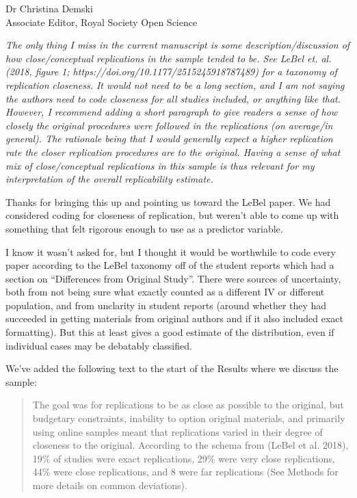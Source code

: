 \documentclass{stanfordletter}
\newcommand{\theysaid}[1]{\begin{leftbar} \noindent 
		\textsl{ #1}\end{leftbar}}
\newcommand{\revised}[1]{\begin{quote}	#1 \end{quote}}
\begin{document}
\begin{letter}{Dr Christina Demski \\ Associate Editor, Royal Society Open Science}
          \theysaid{The only thing I miss in the current manuscript is some description/discussion of how close/conceptual replications in the sample tended to be. See LeBel et. al. (2018, figure 1; https://doi.org/10.1177/2515245918787489) for a taxonomy of replication closeness. It would not need to be a long section, and I am not saying the authors need to code closeness for all studies included, or anything like that. However, I recommend adding a short paragraph to give readers a sense of how closely the original procedures were followed in the replications (on average/in general). The rationale being that I would generally expect a higher replication rate the closer replication procedures are to the original. Having a sense of what mix of close/conceptual replications in this sample is thus relevant for my interpretation of the overall replicability estimate.
          }
          
          Thanks for bringing this up and pointing us toward the LeBel paper. We had considered coding for closeness of replication, but weren't able to come up with something that felt rigorous enough to use as a predictor variable. 
          
          I know it wasn't asked for, but I thought it would be worthwhile to code every paper according to the LeBel taxonomy off of the student reports which had a section on ``Differences from Original Study''. There were sources of uncertainty, both from not being sure what exactly counted as a different IV or different population, and from unclarity in student reports (around whether they had succeeded in getting materials from original authors and if it also included exact formatting). But this at least gives a good estimate of the distribution, even if individual cases may be debatably classified. 
         
          We've added the following text to the start of the Results where we discuss the sample:
          
          \revised{The goal was for replications to be as close as possible to the original, but budgetary constraints, inability to option original materials, and primarily using online samples meant that replications varied in their degree of closeness to the original. According to the schema from (LeBel et al. 2018), 19\% of studies were exact replications, 29\% were very close replications, 44\% were close replications, and 8 were far replications (See Methods for more details on common deviations).}
          

\end{letter}
\end{document}
